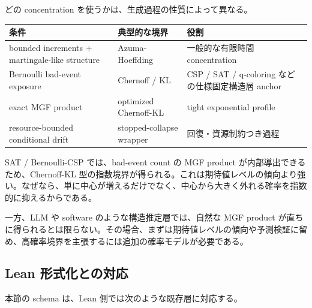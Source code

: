 \documentclass[12pt,a4paper]{article}
\begin{document}
どの concentration を使うかは、生成過程の性質によって異なる。

{\def\LTcaptype{table} %
\begin{longtable}[]{@{}
  >{\raggedright\arraybackslash}p{}
  >{\raggedright\arraybackslash}p{}
  >{\raggedright\arraybackslash}p{}@{}}
\toprule\noalign{}
\begin{minipage}[b]{\linewidth}\raggedright
条件
\end{minipage} & \begin{minipage}[b]{\linewidth}\raggedright
典型的な境界
\end{minipage} & \begin{minipage}[b]{\linewidth}\raggedright
役割
\end{minipage} \\
\midrule\noalign{}
\endhead
\bottomrule\noalign{}
\endlastfoot
bounded increments + martingale-like structure & Azuma-Hoeffding & 一般的な有限時間 concentration \\
Bernoulli bad-event exposure & Chernoff / KL & CSP / SAT / q-coloring などの仕様固定構造層 anchor \\
exact MGF product & optimized Chernoff-KL & tight exponential profile \\
resource-bounded conditional drift & stopped-collapse wrapper & 回復・資源制約つき過程 \\
\end{longtable}
}

SAT / Bernoulli-CSP では、bad-event count の MGF product が内部導出できるため、Chernoff-KL 型の指数境界が得られる。これは期待値レベルの傾向より強い。なぜなら、単に中心が増えるだけでなく、中心から大きく外れる確率を指数的に抑えるからである。

一方、LLM や software のような構造推定層では、自然な MGF product が直ちに得られるとは限らない。その場合、まずは期待値レベルの傾向や予測検証に留め、高確率境界を主張するには追加の確率モデルが必要である。

\subsection{Lean 形式化との対応}\label{lean-ux5f62ux5f0fux5316ux3068ux306eux5bfeux5fdc-1}

本節の schema は、Lean 側では次のような既存層に対応する。
\end{document}
